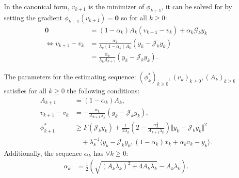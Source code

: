 \documentclass[12pt]{article}
\begin{document}
        In the canonical form, $v_{k + 1}$ is the minimizer of $\phi_{k + 1}$, it can be solved for by setting the gradient $\phi_{k + 1}(v_{k + 1})= \mathbf 0$ so for all $k\ge 0$: 
        \begin{align*}
            \mathbf 0 &= (1 - \alpha_k)A_k(v_{k + 1} - v_k) + \alpha_k \mathcal G_k y_k
            \\
            \iff 
            v_{k + 1} - v_k &= 
            \frac{\alpha_k}{\lambda_k(1 - \alpha_k)A_k}
            \left(
                y_k - \mathcal J_k y_k
            \right)
            \\
            &= \frac{\alpha_k}{\lambda_kA_{k + 1}}
            \left(
                y_k - \mathcal J_k y_k
            \right). 
        \end{align*}
        \begin{theorem}\label{app:thm:est-seq-acc-ppm}
            The parameters for the estimating sequence: $(\phi_k^*)_{k\ge 0}, (v_k)_{k\ge 0}, (A_k)_{k\ge 0}$ satisfies for all $k \ge0 $ the following conditions:
            \begin{align*}
                A_{k + 1} &= (1 - \alpha_k)A_k, 
                \\
                v_{k + 1} - v_k
                &= 
                - \frac{\alpha_k}{A_{k + 1}\lambda_k}(y_k - \mathcal J_k y_k), 
                \\
                \phi_{k + 1}^*
                &\ge 
                F(\mathcal J_ky_k) + 
                \frac{1}{2\lambda_k}\left(
                    2 - \frac{\alpha_k^2}{A_{k + 1}\lambda_k}
                \right)
                \Vert y_k - \mathcal J_k y_k\Vert^2
                \\
                    & \quad 
                    + 
                    \lambda_k^{-1}
                    \langle 
                        y_k - \mathcal J_k y_k, (1 - \alpha_k)x_k + \alpha_k v_k - y_k
                    \rangle.
            \end{align*}
            Additionally, the sequence $\alpha_k$ has $\forall k \ge0$: 
            \begin{align*}
                \alpha_k
                &= 
                \frac{1}{2}\left(
                    \sqrt{(A_k\lambda_k)^2 + 4A_k \lambda_k}
                    - A_k\lambda_k
                \right). 
            \end{align*}
        \end{theorem}
\end{document}
